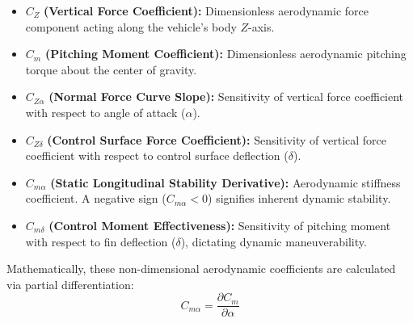 \documentclass[11pt, a4paper]{article}
\begin{document}
\begin{itemize}
    \item $C_Z$ \textbf{(Vertical Force Coefficient):} Dimensionless aerodynamic force component acting along the vehicle's body $Z$-axis.
    \item $C_m$ \textbf{(Pitching Moment Coefficient):} Dimensionless aerodynamic pitching torque about the center of gravity.
    \item $C_{Z\alpha}$ \textbf{(Normal Force Curve Slope):} Sensitivity of vertical force coefficient with respect to angle of attack ($\alpha$).
    \item $C_{Z\delta}$ \textbf{(Control Surface Force Coefficient):} Sensitivity of vertical force coefficient with respect to control surface deflection ($\delta$).
    \item $C_{m\alpha}$ \textbf{(Static Longitudinal Stability Derivative):} Aerodynamic stiffness coefficient. A negative sign ($C_{m\alpha} < 0$) signifies inherent dynamic stability.
    \item $C_{m\delta}$ \textbf{(Control Moment Effectiveness):} Sensitivity of pitching moment with respect to fin deflection ($\delta$), dictating dynamic maneuverability.
\end{itemize}

Mathematically, these non-dimensional aerodynamic coefficients are calculated via partial differentiation:
\begin{equation}
C_{m\alpha} = \frac{\partial C_m}{\partial \alpha}
\end{equation}
\end{document}
